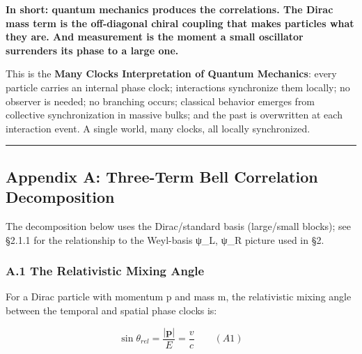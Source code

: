 \documentclass[
]{article}
\begin{document}
\textbf{In short: quantum mechanics produces the correlations. The Dirac
mass term is the off-diagonal chiral coupling that makes particles what
they are. And measurement is the moment a small oscillator surrenders
its phase to a large one.}

This is the \textbf{Many Clocks Interpretation of Quantum Mechanics}:
every particle carries an internal phase clock; interactions synchronize
them locally; no observer is needed; no branching occurs; classical
behavior emerges from collective synchronization in massive bulks; and
the past is overwritten at each interaction event. A single world, many
clocks, all locally synchronized.

\begin{center}\rule{0.5\linewidth}{0.5pt}\end{center}

\subsection{Appendix A: Three-Term Bell Correlation
Decomposition}\label{appendix-a-three-term-bell-correlation-decomposition}

The decomposition below uses the Dirac/standard basis (large/small
blocks); see §2.1.1 for the relationship to the Weyl-basis ψ\_L, ψ\_R
picture used in §2.

\subsubsection{A.1 The Relativistic Mixing
Angle}\label{a.1-the-relativistic-mixing-angle}

For a Dirac particle with momentum p and mass m, the relativistic mixing
angle between the temporal and spatial phase clocks is:

\[\sin\theta_{rel} = \frac{|\mathbf{p}|}{E} = \frac{v}{c} \qquad (A1)\]
\end{document}
